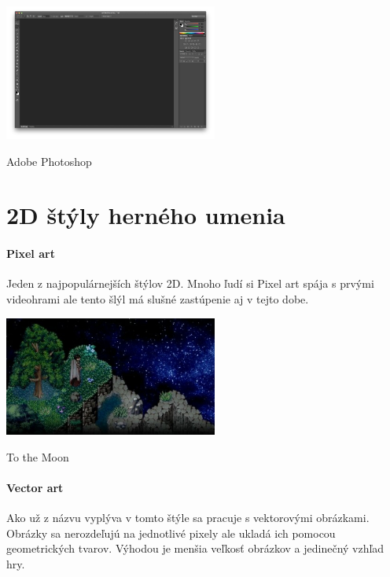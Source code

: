 \documentclass[10pt,twoside,slovak,a4paper]{article}
\begin{document}
\includegraphics[width=7cm]{7006111691_df16f22507_b}
\caption{Adobe Photoshop}

\section{2D štýly herného umenia}
\paragraph{Pixel art}
Jeden z najpopulárnejších štýlov 2D. Mnoho ľudí si Pixel art spája s prvými videohrami ale tento šlýl má slušné zastúpenie aj v tejto dobe. 

\includegraphics[width=7cm]{moon.jpg}
\caption{To the Moon} 

\paragraph{Vector art}
Ako už z názvu vyplýva v tomto štýle sa pracuje s vektorovými obrázkami. Obrázky sa nerozdeľujú na jednotlivé pixely ale ukladá ich pomocou geometrických tvarov. Výhodou je menšia veľkosť obrázkov a jedinečný vzhľad hry.































\end{document}
